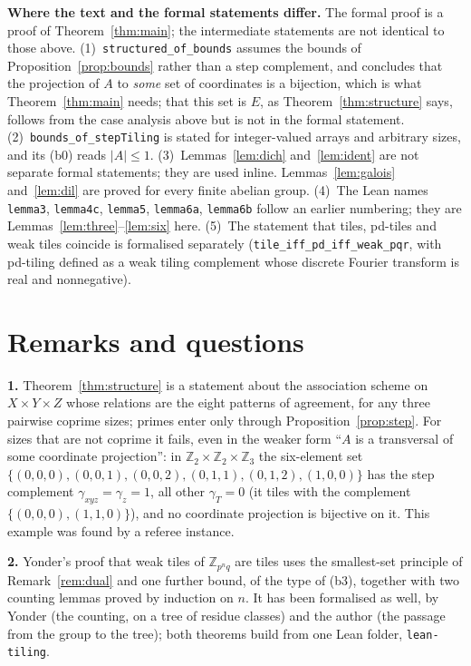 \documentclass[11pt,a4paper]{amsart}
\theoremstyle{definition}
\theoremstyle{remark}
\newcommand{\Z}{\mathbb{Z}}
\newcommand{\lean}[1]{\texttt{#1}}
\begin{document}
\medskip
{\sloppy\noindent\textbf{Where the text and the formal statements differ.} The formal proof is a proof of
Theorem~\ref{thm:main}; the intermediate statements are not identical to those above.
(1)~\lean{structured\_of\_bounds} assumes the bounds of Proposition~\ref{prop:bounds} rather than a step
complement, and concludes that the projection of $A$ to \emph{some} set of coordinates is a bijection, which is
what Theorem~\ref{thm:main} needs; that this set is $E$, as Theorem~\ref{thm:structure} says, follows from the
case analysis above but is not in the formal statement.
(2)~\lean{bounds\_of\_stepTiling} is stated for integer-valued arrays and arbitrary sizes, and its (b0) reads
$|A|\le 1$.
(3)~Lemmas~\ref{lem:dich} and~\ref{lem:ident} are not separate formal statements; they are used inline.
Lemmas~\ref{lem:galois} and~\ref{lem:dil} are proved for every finite abelian group.
(4)~The Lean names \lean{lemma3}, \lean{lemma4c}, \lean{lemma5}, \lean{lemma6a}, \lean{lemma6b} follow an earlier
numbering; they are Lemmas~\ref{lem:three}--\ref{lem:six} here.
(5)~The statement that tiles, pd-tiles and weak tiles coincide is formalised separately
(\lean{tile\_iff\_pd\_iff\_weak\_pqr}, with pd-tiling defined as a weak tiling complement whose discrete Fourier
transform is real and nonnegative).\par}

\section{Remarks and questions}

\textbf{1.} Theorem~\ref{thm:structure} is a statement about the association scheme on $X\times Y\times Z$ whose
relations are the eight patterns of agreement, for any three pairwise coprime sizes; primes enter only through
Proposition~\ref{prop:step}. For sizes that are not coprime it fails, even in the weaker form ``$A$ is a
transversal of some coordinate projection'': in $\Z_2\times\Z_2\times\Z_3$ the six-element set
$\{(0,0,0),(0,0,1),(0,0,2),(0,1,1),(0,1,2),(1,0,0)\}$ has the step complement $\gamma_{xyz}=\gamma_{z}=1$, all
other $\gamma_T=0$ (it tiles with the complement $\{(0,0,0),(1,1,0)\}$), and no coordinate projection is
bijective on it. This example was found by a referee instance.

\textbf{2.} Yonder's proof that weak tiles of $\Z_{p^nq}$ are tiles uses the smallest-set principle of
Remark~\ref{rem:dual} and one further bound, of the type of (b3), together with two counting lemmas proved by
induction on $n$. It has been formalised as well, by Yonder (the counting, on a tree of residue classes) and the
author (the passage from the group to the tree); both theorems build from one Lean folder, \texttt{lean-tiling}.
\end{document}

